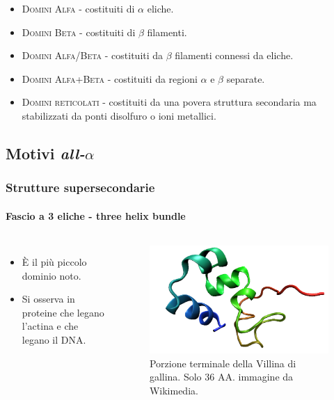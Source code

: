 \documentclass{beamer}
\begin{document}
\begin{frame}
\begin{itemize}
 \item \textsc{Domini Alfa} - costituiti di $\alpha$ eliche.
\pause  \item \textsc{Domini Beta} - costituiti di $\beta$ filamenti.
\pause  \item \textsc{Domini Alfa/Beta} - costituiti da $\beta$ filamenti connessi da eliche.
\pause  \item \textsc{Domini Alfa+Beta} - costituiti da regioni $\alpha$ e $\beta$ separate.
\pause  \item \textsc{Domini reticolati} - costituiti da una povera struttura secondaria ma stabilizzati da ponti disolfuro o ioni metallici.
\end{itemize}

\end{frame}

\subsection{Motivi \itshape{all-$\alpha$} }
\begin{frame}
 \frametitle{Strutture supersecondarie}
  \framesubtitle{Fascio a 3 eliche - three helix bundle }
\begin{columns}
      
\begin{itemize}
 \item È il più piccolo dominio noto.
 \item Si osserva in proteine che legano l'actina e che legano il DNA.
\end{itemize}
      \vskip -10pt
\begin{figure}
\includegraphics[scale=0.25]{3helix-bundle.png}\caption{Porzione terminale della Villina di gallina. Solo 36 AA. \tiny{immagine da Wikimedia.}}
\end{figure}
\end{columns}
\end{frame}
\end{document}
